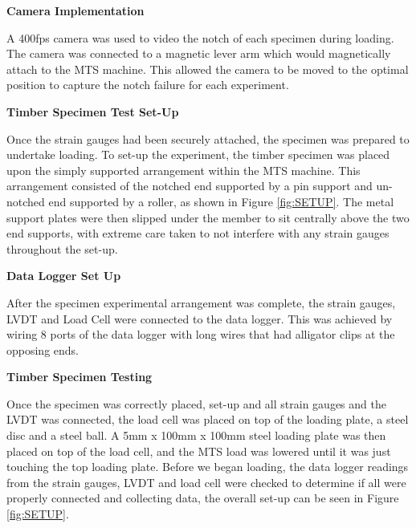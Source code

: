 \documentclass[11pt,a4paper]{article}
\numberwithin{equation}{subsection}
\begin{document}
\vspace*{\baselineskip}

\noindent
\textbf{Camera Implementation}\par
\noindent
A 400fps camera was used to video the notch of each specimen during loading. The camera was connected to a magnetic lever arm which would magnetically attach to the MTS machine. This allowed the camera to be moved to the optimal position to capture the notch failure for each experiment.

\vspace*{\baselineskip}

\noindent
\textbf{Timber Specimen Test Set-Up}\par
\noindent
Once the strain gauges had been securely attached, the specimen was prepared to undertake loading. To set-up the experiment, the timber specimen was placed upon the simply supported arrangement within the MTS machine. This arrangement consisted of the notched end supported by a pin support and un-notched end supported by a roller, as shown in Figure \ref{fig:SETUP}. The metal support plates were then slipped under the member to sit centrally above the two end supports, with extreme care taken to not interfere with any strain gauges throughout the set-up. 

\vspace*{\baselineskip}

\noindent
\textbf{Data Logger Set Up}\par
\noindent
After the specimen experimental arrangement was complete, the strain gauges, LVDT and Load Cell were connected to the data logger. This was achieved by wiring 8 ports of the data logger with long wires that had alligator clips at the opposing ends.

\vspace*{\baselineskip}

\noindent
\textbf{Timber Specimen Testing}\par
\noindent
Once the specimen was correctly placed, set-up and all strain gauges and the LVDT was connected, the load cell was placed on top of the loading plate, a steel disc and a steel ball. A 5mm x 100mm x 100mm steel loading plate was then placed on top of the load cell, and the MTS load was lowered until it was just touching the top loading plate. Before we began loading, the data logger readings from the strain gauges, LVDT and load cell were checked to determine if all were properly connected and collecting data, the overall set-up can be seen in Figure \ref{fig:SETUP}.
\end{document}
